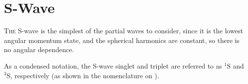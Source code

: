\documentclass[Dissertation.tex]{subfiles}
\begin{document}
\chapter{S-Wave}
\label{chp:SWave}

\lettrine{\textcolor{startcolor}{T}}{he} S-wave is the simplest of the partial waves to consider, since it is the lowest angular momentum state, and the spherical harmonics are constant, so there is no angular dependence.

As a condensed notation, the S-wave singlet and triplet are referred to as $^1$S and $^3$S, respectively (as shown in the nomenclature on \pageref{chp:nomenclature}).

%
%
%
%
\end{document}
